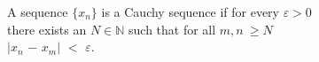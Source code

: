 \documentclass[preview]{standalone}
\begin{document}
\begin{center}
A sequence $\{x_n\}$ is a Cauchy sequence if for every $\varepsilon > 0$\\there exists an $N$$\in$$\mathbb{N}$ such that for all $m, n\:$$ \geq$$N$\\$|$$x_n$ $-$ $x_m$$|$ $<$ $\varepsilon$.
\end{center}
\end{document}
